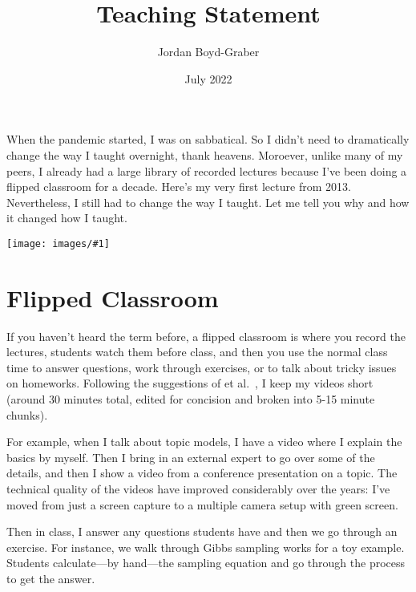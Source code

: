 \documentclass[11pt]{amsart}
\newcommand{\image}[2]{  \begin{center}
\texttt{[image: images/\#1]}
\end{center}
  }
\newcommand{\newcite}[2]{\capitalisewords{#1} et al.~\cite{#1-#2}}
\begin{document}
 \title{Teaching Statement}

 \author{Jordan Boyd-Graber}
\address{University of Maryland}

\date{July 2022}

\maketitle

When the pandemic started, I was on sabbatical.  So I didn’t need to
dramatically change the way I taught overnight, thank heavens.
%
Moroever, unlike many of my peers, I
already had a large library of recorded lectures because I’ve been
doing a flipped classroom for a decade.  Here’s my very first lecture
from 2013.
%
Nevertheless, I still had to change the way I taught.
%
Let me tell you why and how it changed how I taught.

\image{first_video_lecture}{}

\section{Flipped Classroom}

If you haven’t heard the term before, a flipped classroom is where you
record the lectures, students watch them before class, and then you
use the normal class time to answer questions, work through exercises,
or to talk about tricky issues on homeworks.
%
Following the
suggestions of \newcite{Zappe}{09}, I keep my videos short (around 30
minutes total, edited for concision and broken into 5-15 minute
chunks).

For example, when I talk about topic models, I have a video where I
explain the basics by myself.
%
Then I bring in an external expert to
go over some of the details, and then I show a video from a conference
presentation on a topic.
%
The technical quality of the videos have
improved considerably over the years: I’ve moved from just a screen
capture to a multiple camera setup with green screen.

Then in class, I answer any questions students have and then we go
through an exercise.
%
For instance, we walk through Gibbs sampling
works for a toy example.
%
Students calculate—by hand—the sampling
equation and go through the process to get the answer.

%
\end{document}
